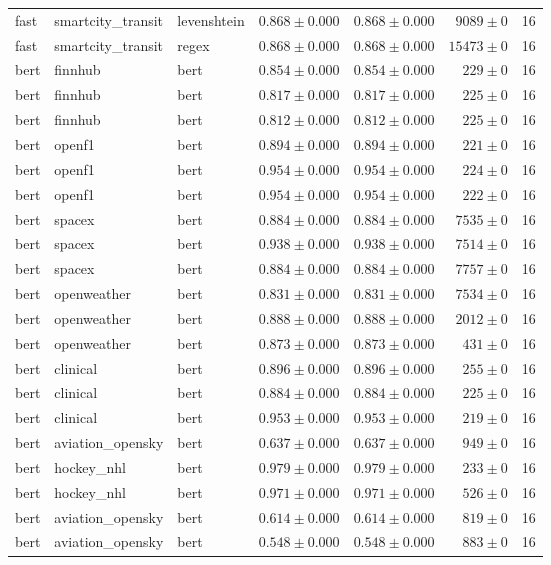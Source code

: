 \begin{table}[htbp]
\begin{tabular}{l l l r r r r}
fast & smartcity\_transit & levenshtein & $0.868\pm0.000$ & $0.868\pm0.000$ & $9089\pm0$ & 16 \\
fast & smartcity\_transit & regex & $0.868\pm0.000$ & $0.868\pm0.000$ & $15473\pm0$ & 16 \\
bert & finnhub & bert & $0.854\pm0.000$ & $0.854\pm0.000$ & $229\pm0$ & 16 \\
bert & finnhub & bert & $0.817\pm0.000$ & $0.817\pm0.000$ & $225\pm0$ & 16 \\
bert & finnhub & bert & $0.812\pm0.000$ & $0.812\pm0.000$ & $225\pm0$ & 16 \\
bert & openf1 & bert & $0.894\pm0.000$ & $0.894\pm0.000$ & $221\pm0$ & 16 \\
bert & openf1 & bert & $0.954\pm0.000$ & $0.954\pm0.000$ & $224\pm0$ & 16 \\
bert & openf1 & bert & $0.954\pm0.000$ & $0.954\pm0.000$ & $222\pm0$ & 16 \\
bert & spacex & bert & $0.884\pm0.000$ & $0.884\pm0.000$ & $7535\pm0$ & 16 \\
bert & spacex & bert & $0.938\pm0.000$ & $0.938\pm0.000$ & $7514\pm0$ & 16 \\
bert & spacex & bert & $0.884\pm0.000$ & $0.884\pm0.000$ & $7757\pm0$ & 16 \\
bert & openweather & bert & $0.831\pm0.000$ & $0.831\pm0.000$ & $7534\pm0$ & 16 \\
bert & openweather & bert & $0.888\pm0.000$ & $0.888\pm0.000$ & $2012\pm0$ & 16 \\
bert & openweather & bert & $0.873\pm0.000$ & $0.873\pm0.000$ & $431\pm0$ & 16 \\
bert & clinical & bert & $0.896\pm0.000$ & $0.896\pm0.000$ & $255\pm0$ & 16 \\
bert & clinical & bert & $0.884\pm0.000$ & $0.884\pm0.000$ & $225\pm0$ & 16 \\
bert & clinical & bert & $0.953\pm0.000$ & $0.953\pm0.000$ & $219\pm0$ & 16 \\
bert & aviation\_opensky & bert & $0.637\pm0.000$ & $0.637\pm0.000$ & $949\pm0$ & 16 \\
bert & hockey\_nhl & bert & $0.979\pm0.000$ & $0.979\pm0.000$ & $233\pm0$ & 16 \\
bert & hockey\_nhl & bert & $0.971\pm0.000$ & $0.971\pm0.000$ & $526\pm0$ & 16 \\
bert & aviation\_opensky & bert & $0.614\pm0.000$ & $0.614\pm0.000$ & $819\pm0$ & 16 \\
bert & aviation\_opensky & bert & $0.548\pm0.000$ & $0.548\pm0.000$ & $883\pm0$ & 16 \\

\end{tabular}
\end{table}
